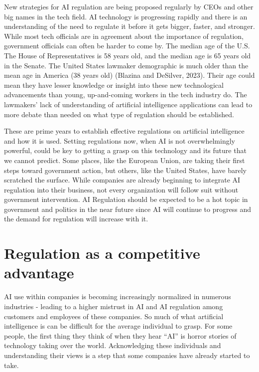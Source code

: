 \documentclass[
]{book}
\begin{document}
New strategies for AI regulation are being proposed regularly by CEOs and other big names in the tech field. AI technology is progressing rapidly and there is an understanding of the need to regulate it before it gets bigger, faster, and stronger. While most tech officials are in agreement about the importance of regulation, government officials can often be harder to come by. The median age of the U.S. The House of Representatives is 58 years old, and the median age is 65 years old in the Senate. The United States lawmaker demographic is much older than the mean age in America (38 years old) (Blazina and DeSilver, 2023). Their age could mean they have lesser knowledge or insight into these new technological advancements than young, up-and-coming workers in the tech industry do. The lawmakers' lack of understanding of artificial intelligence applications can lead to more debate than needed on what type of regulation should be established.

These are prime years to establish effective regulations on artificial intelligence and how it is used. Setting regulations now, when AI is not overwhelmingly powerful, could be key to getting a grasp on this technology and its future that we cannot predict. Some places, like the European Union, are taking their first steps toward government action, but others, like the United States, have barely scratched the surface. While companies are already beginning to integrate AI regulation into their business, not every organization will follow suit without government intervention. AI Regulation should be expected to be a hot topic in government and politics in the near future since AI will continue to progress and the demand for regulation will increase with it.

\hypertarget{regulation-as-a-competitive-advantage}{%
\section{Regulation as a competitive advantage}\label{regulation-as-a-competitive-advantage}}

AI use within companies is becoming increasingly normalized in numerous industries - leading to a higher mistrust in AI and AI regulation among customers and employees of these companies. So much of what artificial intelligence is can be difficult for the average individual to grasp. For some people, the first thing they think of when they hear ``AI'' is horror stories of technology taking over the world. Acknowledging these individuals and understanding their views is a step that some companies have already started to take.
\end{document}
